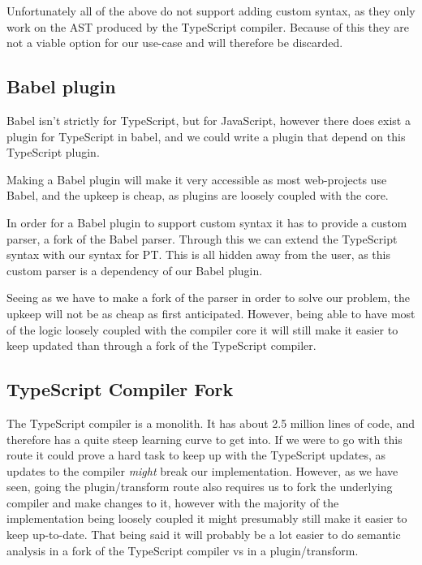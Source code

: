 Unfortunately all of the above do not support adding custom syntax, as they only work on the AST produced by the TypeScript compiler.
Because of this they are not a viable option for our use-case and will therefore be discarded.

\subsection{Babel plugin}\label{subsec:babel-plugin}

Babel isn't strictly for TypeScript, but for JavaScript, however there does exist a plugin for TypeScript in babel, and we could write a plugin that depend on this TypeScript plugin.

Making a Babel plugin will make it very accessible as most web-projects use Babel, and the upkeep is cheap, as plugins are loosely coupled with the core.

In order for a Babel plugin to support custom syntax it has to provide a custom parser, a fork of the Babel parser.
Through this we can extend the TypeScript syntax with our syntax for PT\@.
This is all hidden away from the user, as this custom parser is a dependency of our Babel plugin.

Seeing as we have to make a fork of the parser in order to solve our problem, the upkeep will not be as cheap as first anticipated.
However, being able to have most of the logic loosely coupled with the compiler core it will still make it easier to keep updated than through a fork of the TypeScript compiler.

\subsection{TypeScript Compiler Fork}\label{subsec:typescript-compiler-fork}

The TypeScript compiler is a monolith.
It has about 2.5 million lines of code, and therefore has a quite steep learning curve to get into.
If we were to go with this route it could prove a hard task to keep up with the TypeScript updates, as updates to the compiler \textit{might} break our implementation.
However, as we have seen, going the plugin/transform route also requires us to fork the underlying compiler and make changes to it, however with the majority of the implementation being loosely coupled it might presumably still make it easier to keep up-to-date.
That being said it will probably be a lot easier to do semantic analysis in a fork of the TypeScript compiler vs in a plugin/transform.


